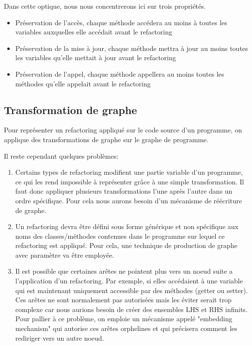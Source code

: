 \documentclass[a4paper, 12pt]{article}
\begin{document}
  Dans cette optique, nous nous concentrerons ici sur trois propriétés.

  \begin{itemize}[label=\textbullet]
    \item Préservation de l'accès, chaque méthode accédera au moins à toutes les variables auxquelles elle accédait avant le refactoring
    \item Préservation de la mise à jour, chaque méthode mettra à jour au moins toutes les variables qu'elle mettait à jour avant le refactoring
    \item Préservation de l'appel, chaque méthode appellera au moins toutes les méthodes qu'elle appelait avant le refactoring
  \end{itemize}

  \subsection{Transformation de graphe}

  Pour représenter un refactoring appliqué sur le code source d'un programme, on applique des transformations de graphe sur le graphe de programme.

  Il reste cependant quelques problèmes:

  \begin{enumerate}
    \item Certains types de refactoring modifient une partie variable d'un programme, ce qui les rend impossible à représenter grâce à une simple transformation.
    Il faut donc appliquer plusieurs transformations l'une après l'autre dans un ordre spécifique. Pour cela nous aurons besoin d'un mécanisme de réécriture de graphe.

    \item Un refactoring devra être défini sous forme générique et non spécifique aux noms des classes/méthodes contenues dans le programme sur lequel ce refactoring est appliqué.
    Pour cela, une technique de production de graphe avec paramètre va être employée.

    \item Il est possible que certaines arêtes ne pointent plus vers un noeud suite a l'application d'un refactoring.
    Par exemple, si elles accédaient à une variable qui est maintenant uniquement accessible par des méthodes (getter ou setter).
    Ces arêtes ne sont normalement pas autorisées mais les éviter serait trop complexe car nous aurions besoin de créer des ensembles LHS et RHS infinits.
    Pour pallier à ce problème, on emploie un mécanisme appelé "embedding mechanism" qui autorise ces arêtes orphelines et qui précisera comment les rediriger vers un autre noeud.

  \end{enumerate}
\end{document}
